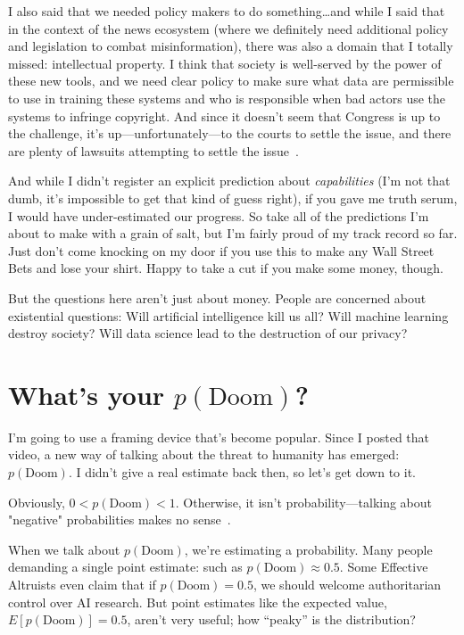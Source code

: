 I also said that we needed policy makers to do something\dots and
while I said that in the context of the news ecosystem (where we
definitely need additional policy and legislation to combat
misinformation), there was also a domain that I totally missed:
intellectual property. I think that society is well-served by the
power of these new tools, and we need clear policy to make sure what
data are permissible to use in training these systems and who is
responsible when bad actors use the systems to infringe copyright. And
since it doesn’t seem that Congress is up to the challenge, it’s
up---unfortunately---to the courts to settle the issue, and there are
plenty of lawsuits attempting to settle the issue~\cite{}.

And while I didn't register an explicit prediction about
\emph{capabilities} (I'm not that dumb, it's impossible to get that
kind of guess right), if you gave me truth serum, I would have
under-estimated our progress.
%
So take all of the predictions I'm about to make with a grain of salt,
but I'm fairly proud of my track record so far.
%
Just don't come knocking on my door if you use this to make any Wall
Street Bets and lose your shirt.
%
Happy to take a cut if you make some money, though.

But the questions here aren't just about money.
%
People are concerned about existential questions: Will artificial
intelligence kill us all? Will machine learning destroy society? Will
data science lead to the destruction of our privacy?

\section{What's your $p(\mbox{Doom})$?}

I'm going to use a framing device that's become popular.  Since I
posted that video, a new way of talking about the threat to humanity
has emerged: $p(\text{Doom})$. I didn’t give a real estimate back
then, so let’s get down to it.

Obviously, $0 < p(\text{Doom}) < 1$. Otherwise, it isn't
probability---talking about "negative" probabilities makes no
sense~\cite{}.

When we talk about $p(\text{Doom})$, we’re estimating a
probability. Many people demanding a single point estimate: such as
$p(\text{Doom}) \approx 0.5$. Some Effective Altruists even claim that
if $p(\text{Doom}) = 0.5$, we should welcome authoritarian control
over AI research. But point estimates like the expected value,
$E[p(\text{Doom})] = 0.5$, aren't very useful; how ``peaky'' is the
distribution?

